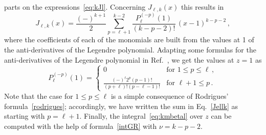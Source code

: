 \documentclass[prd,preprint,superscriptaddress,tightenlines,nofootinbib,
  eqsecnum,showpacs]{revtex4}
\begin{document}
parts on the expressions~\eqref{eq:kJl}. Concerning $J_{\ell,k}(x)$
this results in
%
\begin{equation}\label{Jellk}
J_{\ell,k}(x) = \frac{(-)^{k+1}}{2}\sum_{p=\ell+1}^{k-2}
\frac{P^{(-p)}_\ell(1)}{(k-p-2)!}\,(x-1)^{k-p-2} \,,
\end{equation}
% 
where the coefficients of each of the monomials are built from the
values at 1 of the anti-derivatives of the Legendre
polynomial. Adapting some formulas for the anti-derivatives of the
Legendre polynomial in Ref.~\cite{GR}, we get the values at $z=1$ as
%
\begin{equation}
\label{Plk1}
P^{(-p)}_\ell(1) = \left\{\begin{array}{lr} 0 &\text{for $1\leqslant
  p\leqslant\ell$}\,,\\[0.4cm]\displaystyle \frac{(-)^\ell 2^{p}
  (p-1)!}{(p+\ell)!(p-\ell-1)!} &\text{for $\ell+1\leqslant
  p$}\,.\end{array}\right.
\end{equation}
%
Note that the case for $1\leqslant p\leqslant\ell$ is a simple
consequence of Rodrigues' formula~\eqref{rodrigues}; accordingly, we
have written the sum in Eq.~\eqref{Jellk} as starting with
$p=\ell+1$. Finally, the integral~\eqref{eq:kmbetal} over $z$ can be
computed with the help of formula~\eqref{intGR} with $\nu=k-p-2$.
\end{document}
